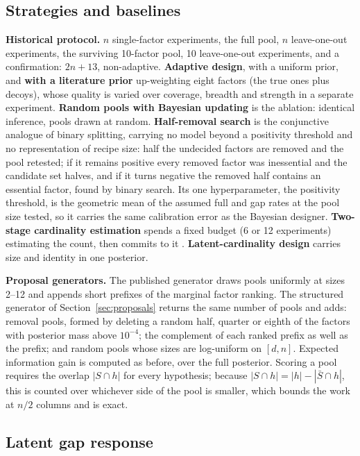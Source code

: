\documentclass[11pt]{article}
\begin{document}
\subsection{Strategies and baselines}

\textbf{Historical protocol.} $n$ single-factor experiments, the full pool, $n$
leave-one-out experiments, the surviving 10-factor pool, 10 leave-one-out
experiments, and a confirmation: $2n + 13$, non-adaptive.
\textbf{Adaptive design}, with a uniform prior, and \textbf{with a literature
prior} up-weighting eight factors (the true ones plus decoys), whose quality is
varied over coverage, breadth and strength in a separate experiment.
\textbf{Random pools with Bayesian updating} is the ablation: identical
inference, pools drawn at random.
\textbf{Half-removal search} is the conjunctive analogue of binary splitting,
carrying no model beyond a positivity threshold and no representation of recipe
size: half the undecided factors are removed and the pool retested; if it
remains positive every removed factor was inessential and the candidate set
halves, and if it turns negative the removed half contains an essential factor,
found by binary search. Its one hyperparameter, the positivity threshold, is the
geometric mean of the assumed full and gap rates at the pool size tested, so it
carries the same calibration error as the Bayesian designer.
\textbf{Two-stage cardinality estimation} spends a fixed budget (6 or 12
experiments) estimating the count, then commits to it \citep{bshouty2018}.
\textbf{Latent-cardinality design} carries size and identity in one posterior.

\textbf{Proposal generators.} The published generator draws pools uniformly at
sizes 2--12 and appends short prefixes of the marginal factor ranking. The
structured generator of Section~\ref{sec:proposals} returns the same number of
pools and adds: removal pools, formed by deleting a random half, quarter or
eighth of the factors with posterior mass above $10^{-4}$; the complement of
each ranked prefix as well as the prefix; and random pools whose sizes are
log-uniform on $[d, n]$. Expected information gain is computed as before, over
the full posterior. Scoring a pool requires the overlap $|S \cap h|$ for every
hypothesis; because $|S \cap h| = |h| - |\bar{S} \cap h|$, this is counted over
whichever side of the pool is smaller, which bounds the work at $n/2$ columns
and is exact.

\subsection{Latent gap response}
\end{document}
